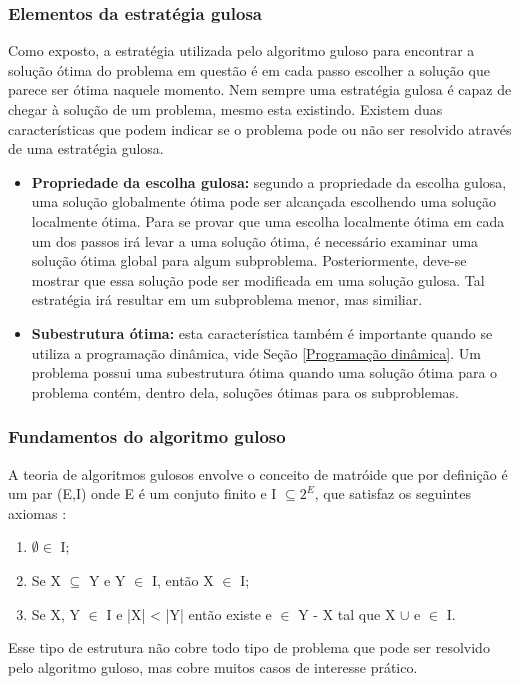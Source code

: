 \subsubsection{Elementos da estratégia gulosa}
Como exposto, a estratégia utilizada pelo algoritmo guloso para encontrar a solução ótima do problema em questão é em cada passo escolher a solução que parece ser ótima naquele momento. Nem sempre uma estratégia gulosa é capaz de chegar à solução de um problema, mesmo esta existindo. Existem duas características que podem indicar se o problema pode ou não ser resolvido através de uma estratégia gulosa.
\begin{itemize}
\item \textbf{Propriedade da escolha gulosa:} segundo a propriedade da escolha gulosa, uma solução globalmente ótima pode ser alcançada escolhendo uma solução localmente ótima. Para se provar que uma escolha localmente ótima em cada um dos passos irá levar a uma solução ótima, é necessário examinar uma solução ótima global para algum subproblema. Posteriormente, deve-se mostrar que essa solução pode ser modificada em uma solução gulosa. Tal estratégia irá resultar em um subproblema menor, mas similiar.
\item \textbf{Subestrutura ótima:} esta característica também é importante quando se utiliza a programação dinâmica, vide Seção \ref{Programação dinâmica}. Um problema possui uma subestrutura ótima quando uma solução ótima para o problema contém, dentro dela, soluções ótimas para os subproblemas.
\end{itemize}
\subsubsection{Fundamentos do algoritmo guloso}
A teoria de algoritmos gulosos envolve o conceito de matróide que por definição é um par (E,I) onde E é um conjuto finito e I $\subseteq 2^{E}$, que satisfaz os seguintes axiomas \cite{paulo2007cobertura}:
\begin{enumerate}[label=(\roman*)]
\item $\emptyset \in$ I;
\item Se X $\subseteq$ Y e Y $\in$ I, então X $\in$ I;
\item Se X, Y $\in$ I e |X| < |Y| então existe e $\in$ Y - X tal que X $\cup$ e $\in$ I.
\end{enumerate}
Esse tipo de estrutura não cobre todo tipo de problema que pode ser resolvido pelo algoritmo guloso, mas cobre muitos casos de interesse prático.

